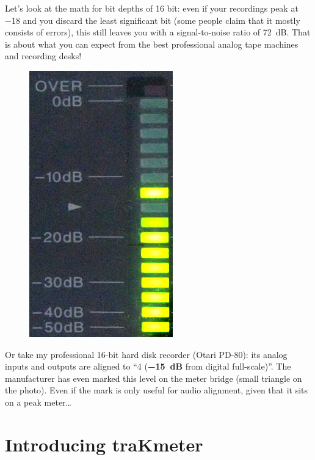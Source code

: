 Let's look at the math for bit depths of 16 bit: even if your
recordings peak at \SI{-18}{\dBFS} and you discard the least
significant bit (some people claim that it mostly consists of errors),
this still leaves you with a signal-to-noise ratio of \SI{72}{\dB}.
That is about what you can expect from the best professional analog
tape machines and recording desks!

\begin{figure}
  \includegraphics[scale=0.24,clip]{include/images/otari_meter.png}
\end{figure}

Or take my professional 16-bit hard disk recorder (Otari PD-80): its
analog inputs and outputs are aligned to ``\SI[addsign=all]{+4}{\dBu}
(\textbf{\SI{-15}{\dB}} from digital full-scale)''.  The manufacturer
has even marked this level on the meter bridge (small triangle on the
photo).  Even if the mark is only useful for audio alignment, given
that it sits on a peak meter\ldots


\section{Introducing traKmeter}
\label{sec:introducing_trakmeter}

